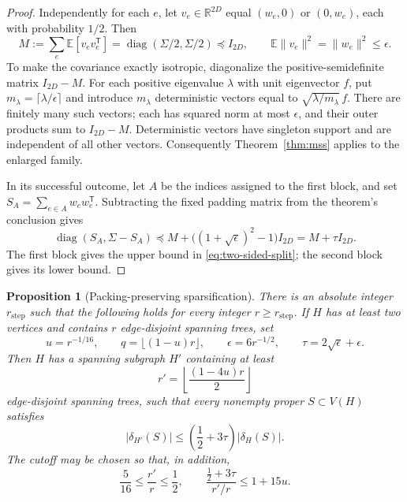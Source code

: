 \documentclass[11pt]{amsart}
\newtheorem{proposition}[theorem]{Proposition}
\theoremstyle{definition}
\theoremstyle{remark}
\numberwithin{equation}{section}
\begin{document}
\begin{proof}
Independently for each $e$, let $v_e\in\mathbb R^{2D}$ equal
$(w_e,0)$ or $(0,w_e)$, each with probability $1/2$.  Then
\[
 M:=\sum_e\mathbb E[v_ev_e^{\mathsf T}]
   =\operatorname{diag}(\Sigma/2,\Sigma/2)\preceq I_{2D},
 \qquad \mathbb E\|v_e\|^2=\|w_e\|^2\leq\epsilon.
\]
To make the covariance exactly isotropic, diagonalize the
positive-semidefinite matrix $I_{2D}-M$.  For each positive eigenvalue
$\lambda$ with unit eigenvector $f$, put
$m_\lambda=\lceil\lambda/\epsilon\rceil$ and introduce
$m_\lambda$ deterministic vectors equal to
$\sqrt{\lambda/m_\lambda}\,f$.
There are finitely many such vectors; each has squared norm at most
$\epsilon$, and their outer products sum to $I_{2D}-M$.
Deterministic vectors have singleton support and are independent of
all other vectors.  Consequently Theorem~\ref{thm:mss} applies to the
enlarged family.

In its successful outcome, let $A$ be the indices assigned to the first
block, and set $S_A=\sum_{e\in A}w_ew_e^{\mathsf T}$.
Subtracting the fixed padding matrix from the theorem's conclusion
gives
\[
 \operatorname{diag}(S_A,\Sigma-S_A)
 \preceq M+\bigl((1+\sqrt\epsilon)^2-1\bigr)I_{2D}
 =M+\tau I_{2D}.
\]
The first block gives the upper bound in
\eqref{eq:two-sided-split}; the second block gives its lower bound.
\end{proof}

\begin{proposition}[Packing-preserving sparsification]
\label{prop:step}
There is an absolute integer $r_{\mathrm{step}}$ such that the following
holds for every integer $r\geq r_{\mathrm{step}}$.  If $H$ has at
least two vertices and contains $r$ edge-disjoint spanning trees, set
\[
 u=r^{-1/16},\qquad q=\lfloor(1-u)r\rfloor,
 \qquad \epsilon=6r^{-1/2},\qquad
 \tau=2\sqrt\epsilon+\epsilon.
\]
Then $H$ has a spanning subgraph $H'$ containing at least
\begin{equation}
 r'=\left\lfloor\frac{(1-4u)r}{2}\right\rfloor
 \label{eq:step-packing-count}
\end{equation}
edge-disjoint spanning trees, such that every nonempty proper
$S\subset V(H)$ satisfies
\begin{equation}
 |\delta_{H'}(S)|\leq
 \left(\frac12+3\tau\right)|\delta_H(S)|.
 \label{eq:step-cut-bound}
\end{equation}
The cutoff may be chosen so that, in addition,
\begin{equation}
 \frac5{16}\leq\frac{r'}r\leq\frac12,
 \qquad
 \frac{\frac12+3\tau}{r'/r}\leq1+15u.
 \label{eq:step-ratio-bound}
\end{equation}
\end{proposition}
\end{document}
